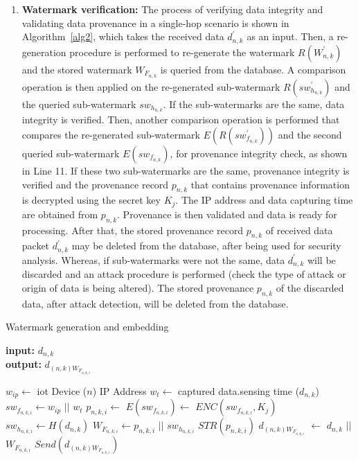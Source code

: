 \documentclass{llncs}
\begin{document}
\begin{enumerate}
    \item \textbf{Watermark verification:} The process of verifying data integrity and validating data provenance in a single-hop scenario is shown in Algorithm~\ref{alg2}, which takes the received data $d^{'}_{n,k}$ as an input. Then, a re-generation procedure is performed to re-generate the watermark $R(W^{'}_{n,k})$ and the stored watermark $W_{F_{n,k}}$ is queried from the database. A comparison operation is then applied on the re-generated sub-watermark $R(sw^{'}_{h_{n,k}})$ and the queried sub-watermark $sw_{h_{n,k}}$. If the sub-watermarks are the same, data integrity is verified. Then, another comparison operation is performed that compares the re-generated sub-watermark $E(R(sw^{'}_{f_{n,k}}))$ and the second queried sub-watermark $E(sw_{f_{n,k}})$, for provenance integrity check, as shown in Line 11. If these two sub-watermarks are the same, provenance integrity is verified and the provenance record $p_{n,k}$ that contains provenance information is decrypted using the secret key $K_j$. The IP address and data capturing time are obtained from $p_{n,k}$. Provenance is then validated and data is ready for processing. After that, the stored provenance record $p_{n,k}$ of received data packet $d^{'}_{n,k}$ may be deleted from the database, after being used for security analysis. Whereas, if sub-watermarks were not the same, data $d^{'}_{n,k}$ will be discarded and an attack procedure is performed (check the type of attack or origin of data is being altered). The stored provenance $p_{n,k}$ of the discarded data, after attack detection, will be deleted from the database. 
    
\end{enumerate}



    \begin{algorithm}[!htbp]
    \caption{Watermark generation and embedding}\label{alg3}
    \hspace*{\algorithmicindent} \textbf{input:} $d_{n,k}$ \\
    \hspace*{\algorithmicindent} \textbf{output:} $d_{(n,k)W_{F_{n,k,i}}}$
    \begin{algorithmic}[1]
    \State $w_{ip} \gets $ \gls*{iot} Device ($n$) IP Address
    \State $w_{t} \gets $ captured data.sensing time ($d_{n,k}$)
    \State $sw_{f_{n,k,i}} \gets w_{ip} $ $||$ $w_{t}$
    \State $p_{n,k,i} \gets$ $E(sw_{f_{n,k,i}}) \gets$ $ENC(sw_{f_{n,k,i}},K_j)$
    \State $sw_{h_{n,k,i}} \gets H(d_{n,k})$ 
    \State $W_{F_{n,k,i}} \gets p_{n,k,i}$ $ || $ $sw_{h_{n,k,i}}$
    \State $STR(p_{n,k,i})$
    \EndProcedure
    \State $d_{(n,k)W_{F_{n,k,i}}}$ $\gets$ $d_{n,k}$ $||$ $W_{F_{n,k,i}}$
    \State $Send(d_{(n,k)W_{F_{n,k,i}}})$
    \EndProcedure
    \end{algorithmic}
    \end{algorithm}
    
\end{document}
